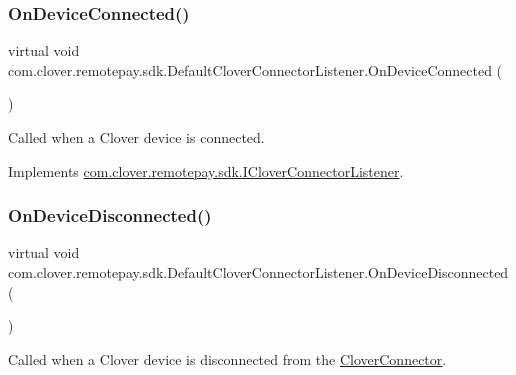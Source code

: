 \subsubsection{\texorpdfstring{On\+Device\+Connected()}{OnDeviceConnected()}}
{\footnotesize\ttfamily virtual void com.\+clover.\+remotepay.\+sdk.\+Default\+Clover\+Connector\+Listener.\+On\+Device\+Connected (\begin{DoxyParamCaption}{ }\end{DoxyParamCaption})\hspace{0.3cm}{\ttfamily [virtual]}}



Called when a Clover device is connected. 



Implements \hyperlink{interfacecom_1_1clover_1_1remotepay_1_1sdk_1_1_i_clover_connector_listener_aa859c19d05f11d75365161fb96c54eda}{com.\+clover.\+remotepay.\+sdk.\+I\+Clover\+Connector\+Listener}.

\mbox{\label{classcom_1_1clover_1_1remotepay_1_1sdk_1_1_default_clover_connector_listener_a2768c7875db334d7615cfac32b8a9115}} 
\subsubsection{\texorpdfstring{On\+Device\+Disconnected()}{OnDeviceDisconnected()}}
{\footnotesize\ttfamily virtual void com.\+clover.\+remotepay.\+sdk.\+Default\+Clover\+Connector\+Listener.\+On\+Device\+Disconnected (\begin{DoxyParamCaption}{ }\end{DoxyParamCaption})\hspace{0.3cm}{\ttfamily [virtual]}}



Called when a Clover device is disconnected from the \hyperlink{classcom_1_1clover_1_1remotepay_1_1sdk_1_1_clover_connector}{Clover\+Connector}. 



